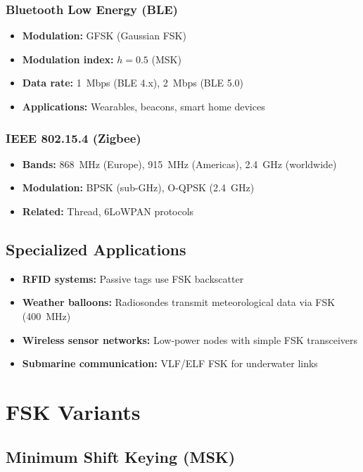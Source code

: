 \subsubsection{Bluetooth Low Energy (BLE)}

\begin{itemize}
\item \textbf{Modulation:} GFSK (Gaussian FSK)
\item \textbf{Modulation index:} $h = 0.5$ (MSK)
\item \textbf{Data rate:} 1~Mbps (BLE 4.x), 2~Mbps (BLE 5.0)
\item \textbf{Applications:} Wearables, beacons, smart home devices
\end{itemize}

\subsubsection{IEEE 802.15.4 (Zigbee)}

\begin{itemize}
\item \textbf{Bands:} 868~MHz (Europe), 915~MHz (Americas), 2.4~GHz (worldwide)
\item \textbf{Modulation:} BPSK (sub-GHz), O-QPSK (2.4~GHz)
\item \textbf{Related:} Thread, 6LoWPAN protocols
\end{itemize}

\subsection{Specialized Applications}

\begin{itemize}
\item \textbf{RFID systems:} Passive tags use FSK backscatter
\item \textbf{Weather balloons:} Radiosondes transmit meteorological data via FSK (400~MHz)
\item \textbf{Wireless sensor networks:} Low-power nodes with simple FSK transceivers
\item \textbf{Submarine communication:} VLF/ELF FSK for underwater links
\end{itemize}

\section{FSK Variants}

\subsection{Minimum Shift Keying (MSK)}

